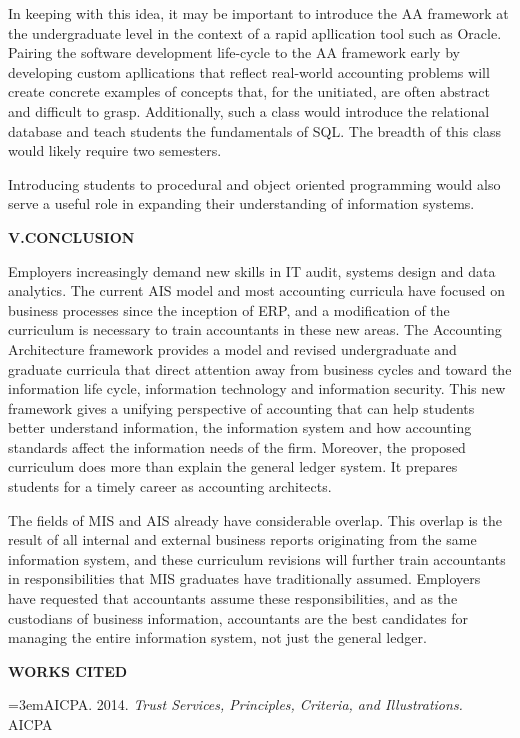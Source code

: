 \documentclass[12pt]{article}
\newcommand{\Section}[2]{\vspace{.2in}\centerline{\normalsize{}\textbf{#1\quad{}\MakeUppercase{#2}}}\nopagebreak{}\smallskip{}\indent{}}
\newcommand{\Reference}[1]{\parindent=0pt\hangindent=3em\hangafter=1#1\vspace{.15in}}
\begin{document}
In keeping with this idea, it may be important to introduce the AA framework at the undergraduate level in the context of a rapid apllication tool such as Oracle.  Pairing the software development life-cycle to the AA framework early by developing custom apllications that reflect real-world accounting problems will create concrete examples of concepts that, for the unitiated, are often abstract and difficult to grasp.  Additionally, such a class would introduce the relational database and teach students the fundamentals of SQL.  The breadth of this class would likely require two semesters.  

Introducing students to procedural and object oriented programming would also serve a useful role in expanding their understanding of information systems.

\Section{V.}{Conclusion}
Employers increasingly demand new skills in IT audit, systems design and data analytics. The current AIS model and most accounting curricula have focused on business processes since the inception of ERP, and a modification of the curriculum is necessary to train accountants in these new areas. The Accounting Architecture framework provides a model and revised undergraduate and graduate curricula that direct attention away from business cycles and toward the information life cycle, information technology and information security. This new framework gives a unifying perspective of accounting that can help students better understand information, the information system and how accounting standards affect the information needs of the firm. Moreover, the proposed curriculum does more than explain the general ledger system. It prepares students for a timely career as accounting architects.

The fields of MIS and AIS already have considerable overlap. This overlap is the result of all internal and external business reports originating from the same information system, and these curriculum revisions will further train accountants in responsibilities that MIS graduates have traditionally assumed. Employers have requested that accountants assume these responsibilities, and as the custodians of business information, accountants are the best candidates for managing the entire information system, not just the general ledger.

\newpage{}

\centerline{\textbf{\MakeUppercase{Works Cited}}}
\smallskip{}
\singlespace{}
\Reference{AICPA. 2014. \emph{Trust Services, Principles, Criteria, and Illustrations.} AICPA}
\end{document}
